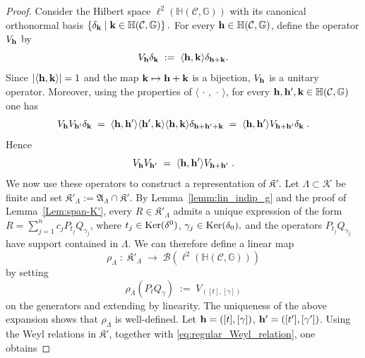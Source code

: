 \documentclass[a4paper,12pt,twoside,reqno]{amsart}
\theoremstyle{plain}
\theoremstyle{definition}
\theoremstyle{remark}
\numberwithin{equation}{section}
\numberwithin{figure}{section}
\numberwithin{table}{section}
\newcommand{\pa}[1]{\left( #1 \right)}
\newcommand{\f}[1]{\mathcal{#1}}
\newcommand{\n}[1]{\mathbb{#1}}
\newcommand{\ab}[1]{\left| #1 \right|}
\begin{document}
	\begin{proof}
		Consider the Hilbert space
		$
		\ell^2\pa{\n{H}(\f{C},\n{G})}
		$
		with its canonical orthonormal basis
		$
		\left\{\delta_{\bf k}\;\middle|\;{\bf k}\in\n{H}(\f{C},\n{G})\right\}.
		$
		For every ${\bf h}\in\n{H}(\f{C},\n{G})$, define the operator $V_{\bf h}$ by
		\begin{equation}\label{eq:regular_representation_H}
			V_{\bf h}\delta_{\bf k}\;:=\;\langle{\bf h},{\bf k}\rangle \delta_{{\bf h}+{\bf k}}.
		\end{equation}
		Since $\ab{\langle{\bf h},{\bf k}\rangle}=1$ and the map ${\bf k}\mapsto{\bf h}+{\bf k}$ is a bijection, $V_{\bf h}$ is a unitary operator.
		Moreover, using the properties of $\langle\,\cdot\,,\,\cdot\,\rangle$, for every ${\bf h},{\bf h}',{\bf k}\in\n{H}(\f{C},\n{G})$ one has
		\begin{align*}
			V_{\bf h}V_{{\bf h}'}\delta_{\bf k}\;=\;\langle{\bf h},{\bf h}'\rangle\langle{\bf h}',{\bf k}\rangle\langle{\bf h},{\bf k}\rangle\delta_{{\bf h}+{\bf h}'+{\bf k}}\;=\;\langle{\bf h},{\bf h}'\rangle V_{{\bf h}+{\bf h}'}\delta_{\bf k}\;.
		\end{align*}
		Hence
		\begin{equation}\label{eq:regular_Weyl_relation}
			V_{\bf h}V_{{\bf h}'}\;=\;\langle{\bf h},{\bf h}'\rangle V_{{\bf h}+{\bf h}'}\;.
		\end{equation}
		We now use these operators to construct a representation of $\mathfrak{K}'$. Let $\Lambda\subset\f{K}$ be finite and set
		$
		\mathfrak{K}'_\Lambda:=\mathfrak{A}_\Lambda\cap\mathfrak{K}'.
		$
		By Lemma~\ref{lemm:lin_indip_g} and the proof of Lemma~\ref{Lem:span-K'}, every $R\in\mathfrak{K}'_\Lambda$ admits a unique expression of the form
		$
		R=\sum_{j=1}^n c_j P_{t_j}Q_{\gamma_j}
		$,
		where
		$
		t_j\in{\rm Ker}(\delta^0)$, $\gamma_j\in{\rm Ker}(\delta_0),
		$
		and the operators $P_{t_j}Q_{\gamma_j}$ have support contained in $\Lambda$.
		We can therefore define a linear map
		\[
		\rho_\Lambda\;:\; \mathfrak{K}'_\Lambda\;\longrightarrow\;\mathcal{B}\pa{\ell^2\pa{\n{H}(\f{C},\n{G})}}
		\]
		by setting
		\begin{equation}\label{eq:rho_local_definition}
			\rho_\Lambda(P_tQ_\gamma)\;:=\;V_{([t],[\gamma])}
		\end{equation}
		on the generators and extending by linearity. The uniqueness of the above expansion shows that $\rho_\Lambda$ is well-defined.
		Let
		$
		{\bf h}=([t],[\gamma])$, ${\bf h}'=([t'],[\gamma'])
		$.
		Using the Weyl relations in $\mathfrak{K}'$, together with \eqref{eq:regular_Weyl_relation}, one obtains

\end{proof}
\end{document}
